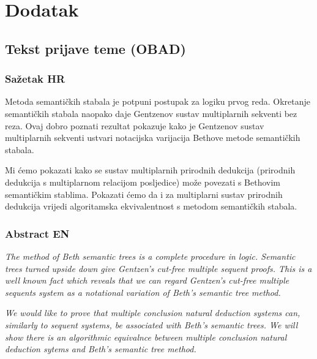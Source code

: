 \chapter{Dodatak}



% 




\section{Tekst prijave teme (OBAD)}


\subsection*{Sažetak HR}
% 
Metoda semantičkih stabala je potpuni postupak za logiku prvog reda. Okretanje semantičkih stabala naopako daje
Gentzenov sustav multiplarnih sekventi bez reza. Ovaj dobro poznati rezultat pokazuje kako je Gentzenov sustav
multiplarnih sekventi ustvari notacijska varijacija Bethove metode semantičkih stabala.

Mi ćemo pokazati kako se sustav multiplarnih prirodnih dedukcija (prirodnih dedukcija s multiplarnom relacijom
posljedice) može povezati s Bethovim semantičkim stablima. Pokazati ćemo da i za multiplarni sustav prirodnih dedukcija
vrijedi algoritamska ekvivalentnost s metodom semantičkih stabala.


\subsection*{Abstract EN}
% 
\textit{The method of Beth semantic trees is a complete procedure in logic. Semantic trees turned upside down give
Gentzen’s cut-free multiple sequent proofs. This is a well known fact which reveals that we can regard Gentzen’s
cut-free multiple sequents system as a notational variation of Beth’s semantic tree method.}

\textit{%
We would like to prove that multiple conclusion natural deduction systems can, similarly to sequent systems, be
associated with Beth’s semantic trees. We will show there is an algorithmic equivalnce between multiple conclusion
natural deduction sytems and Beth's semantic tree method.}



